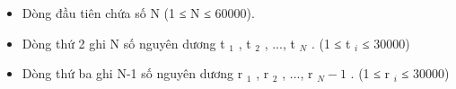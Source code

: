 \begin{itemize}
	\item     Dòng đầu tiên chứa số N (1 ≤ N ≤ 60000).   
	\item     Dòng thứ 2 ghi N số nguyên dương t    $_     1    $    , t    $_     2    $    , ...,   t    $_     N    $    . (1 ≤ t    $_     i    $    ≤ 30000)   
	\item     Dòng thứ ba ghi N-1 số nguyên dương r    $_     1    $    , r    $_     2    $    , ...,   r    $_     N-1    $    . (1 ≤ r    $_     i    $    ≤ 30000)   
\end{itemize}